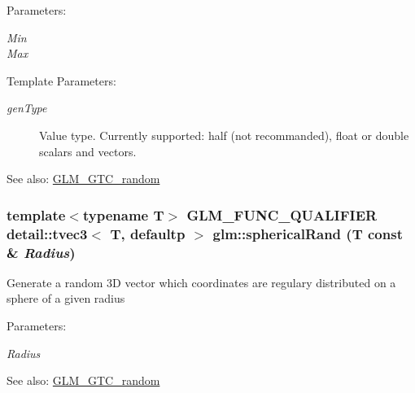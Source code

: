 \begin{Desc}
\item[Parameters:]
\begin{description}
\item[{\em Min}]\item[{\em Max}]\end{description}
\end{Desc}
\begin{Desc}
\item[Template Parameters:]
\begin{description}
\item[{\em genType}]Value type. Currently supported: half (not recommanded), float or double scalars and vectors. \end{description}
\end{Desc}
\begin{Desc}
\item[See also:]\hyperlink{group__gtc__random}{GLM\_\-GTC\_\-random} \end{Desc}
\hypertarget{group__gtc__random_g02f5a6b98ae4e494eef340bcdd38ed35}{
\subsubsection[sphericalRand]{\setlength{\rightskip}{0pt plus 5cm}template$<$typename T$>$ GLM\_\-FUNC\_\-QUALIFIER detail::tvec3$<$ T, defaultp $>$ glm::sphericalRand (T const \& {\em Radius})}}
\label{group__gtc__random_g02f5a6b98ae4e494eef340bcdd38ed35}


Generate a random 3D vector which coordinates are regulary distributed on a sphere of a given radius

\begin{Desc}
\item[Parameters:]
\begin{description}
\item[{\em Radius}]\end{description}
\end{Desc}
\begin{Desc}
\item[See also:]\hyperlink{group__gtc__random}{GLM\_\-GTC\_\-random} \end{Desc}
